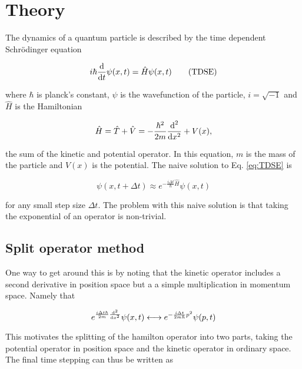 \newpage
\section{Theory}

The dynamics of a quantum particle is described by the time dependent Schrödinger equation

\begin{equation}
  \label{eq:TDSE}
  i \hbar \frac{\textnormal{d}}{\textnormal{d} t}\psi(x,t) = \hat{H}\psi(x,t) \tag{TDSE}
\end{equation}

where $\hbar$ is planck's constant, $\psi$ is the wavefunction of the particle, $i = \sqrt{-1}$ and $\hat{H}$ is the Hamiltonian

\begin{equation}
  \label{eq:ham}
  \hat{H} = \hat{T} + \hat{V} = - \frac{\hbar^2}{2m}\frac{\textnormal{d}^2}{\textnormal{d} x^2} + V(x),
\end{equation}

the sum of the kinetic and potential operator. In this equation, $m$ is the mass of the particle and $V(x)$ is the potential. The naive solution to Eq. \eqref{eq:TDSE} is

\begin{equation}
  \label{eq:TDSEsol}
  \psi(x,t+\Delta t) \approx e^{-\frac{i\Delta t}{\hbar}\hat{H}} \psi(x,t)
\end{equation}

for any small step size $\Delta t$. The problem with this naive solution is that taking the exponential of an operator is non-trivial.

\subsection{Split operator method}

One way to get around this is by noting that the kinetic operator includes a second derivative in position space but a a simple multiplication in momentum space. Namely that

\begin{equation*}
  e^{\frac{i \Delta t \hbar}{2m}\frac{\textnormal{d}^2}{\textnormal{d} x^2}}\psi(x,t) \longleftrightarrow e^{- \frac{i \Delta t }{2m\hbar}p^2}\psi(p,t)
\end{equation*}

This motivates the splitting of the hamilton operator into two parts, taking the potential operator in position space and the kinetic operator in ordinary space. The final time stepping can thus be written as

